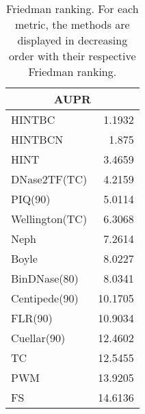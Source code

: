 \documentclass[landscape, 6pt]{report}
\begin{document}
\begin{table}[h!]
\label{tab:ranking}
\vspace{0.0cm}
\begin{center}
\caption{Friedman ranking. For each metric, the methods are displayed in decreasing order with their respective Friedman ranking.}
\renewcommand{\arraystretch}{1.2}
  \begin{tabular}{ |lr| }
    \hline
    \multicolumn{2}{|c|}{\textbf{AUPR}} \\
    \hline
    HINTBC & 1.1932 \\
    HINTBCN & 1.875 \\
    HINT & 3.4659 \\
    DNase2TF(TC) & 4.2159 \\
    PIQ(90) & 5.0114 \\
    Wellington(TC) & 6.3068 \\
    Neph & 7.2614 \\
    Boyle & 8.0227 \\
    BinDNase(80) & 8.0341 \\
    Centipede(90) & 10.1705 \\
    FLR(90) & 10.9034 \\
    Cuellar(90) & 12.4602 \\
    TC & 12.5455 \\
    PWM & 13.9205 \\
    FS & 14.6136 \\
    \hline
  \end{tabular}
\end{center}
\vspace{0.0cm}
\end{table}
\end{document}

